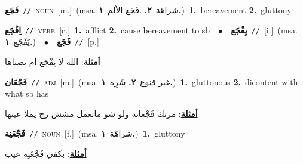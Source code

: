 \documentclass[10pt,a4paper,twoside]{article} %
\begin{document}
\begin{multicols}{2}
{{{{{{{{{{{{\setlength\topsep{0pt}\textbf{\foreignlanguage{arabic}{فَجَع}}\ {\color{gray}\texttt{//}\color{black}}\ \textsc{noun}\ [m.]\ \color{gray}(msa. \foreignlanguage{arabic}{شراهَة}~\foreignlanguage{arabic}{\textbf{٢.}}  .\foreignlanguage{arabic}{فَجَع الألم}~\foreignlanguage{arabic}{\textbf{١.}})\color{black}\ \textbf{1.}~bereavement  \textbf{2.}~gluttony\ 

{\setlength\topsep{0pt}\textbf{\foreignlanguage{arabic}{اِفْجَع}}\ {\color{gray}\texttt{//}\color{black}}\ \textsc{verb}\ [c.]\ \textbf{1.}~afflict  \textbf{2.}~cause bereavement to sb\ \ $\bullet$\ \ \setlength\topsep{0pt}\textbf{\foreignlanguage{arabic}{يِفْجَع}}\ {\color{gray}\texttt{//}\color{black}}\ [i.]\ \color{gray}(msa. \foreignlanguage{arabic}{يَفْجَع}~\foreignlanguage{arabic}{\textbf{١.}})\color{black}\ \ $\bullet$\ \ \setlength\topsep{0pt}\textbf{\foreignlanguage{arabic}{فَجَع}}\ {\color{gray}\texttt{//}\color{black}}\ [p.]\  \begin{flushright}\color{gray}\foreignlanguage{arabic}{\textbf{\underline{\foreignlanguage{arabic}{أمثلة}}}: الله لا يِفْجَع أم بضناها}\end{flushright}\color{black}} \vspace{2mm}

{\setlength\topsep{0pt}\textbf{\foreignlanguage{arabic}{فَجْعَان}}\ {\color{gray}\texttt{//}\color{black}}\ \textsc{adj}\ [m.]\ \color{gray}(msa. \foreignlanguage{arabic}{غير قنوع}~\foreignlanguage{arabic}{\textbf{٢.}}  \foreignlanguage{arabic}{شَرِِه}~\foreignlanguage{arabic}{\textbf{١.}})\color{black}\ \textbf{1.}~gluttonous  \textbf{2.}~dicontent with what sb has\  \begin{flushright}\color{gray}\foreignlanguage{arabic}{\textbf{\underline{\foreignlanguage{arabic}{أمثلة}}}: مرتك فَجْعانة ولو شو ماتعمل مشش رح يملا عينها}\end{flushright}\color{black}} \vspace{2mm}

{\setlength\topsep{0pt}\textbf{\foreignlanguage{arabic}{فَجْعَنِة}}\ {\color{gray}\texttt{//}\color{black}}\ \textsc{noun}\ [f.]\ \color{gray}(msa. \foreignlanguage{arabic}{شراهَة}~\foreignlanguage{arabic}{\textbf{١.}})\color{black}\ \textbf{1.}~gluttony\  \begin{flushright}\color{gray}\foreignlanguage{arabic}{\textbf{\underline{\foreignlanguage{arabic}{أمثلة}}}: بكفي فَجْعَنِة عيب}\end{flushright}\color{black}} \vspace{2mm}

}}}}}}}}}}}}
\end{multicols}
\end{document}
